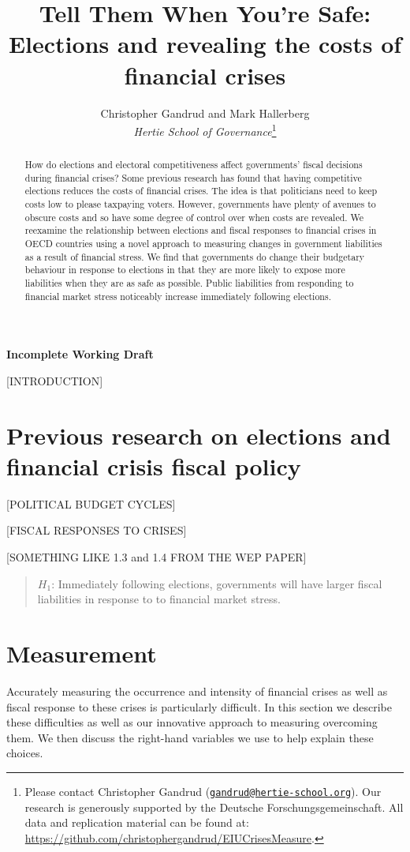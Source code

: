 \documentclass[]{article}
\title{Tell Them When You're Safe: Elections and revealing the costs of financial crises}
\author{Christopher Gandrud and Mark Hallerberg \\ \emph{Hertie School of Governance}\footnote{Please contact Christopher Gandrud
(\href{mailto:gandrud@hertie-school.org}{\nolinkurl{gandrud@hertie-school.org}}).
Our research is generously supported by the Deutsche Forschungsgemeinschaft.
All data and replication material can be found at:
\url{https://github.com/christophergandrud/EIUCrisesMeasure}.}}
\begin{document}
\maketitle


\textbf{Incomplete Working Draft}

\begin{abstract}
How do elections and electoral competitiveness affect governments' fiscal decisions during financial crises? Some previous research has found that having competitive elections reduces the costs of financial crises. The idea is that politicians need to keep costs low to please taxpaying voters. However, governments have plenty of avenues to obscure costs and so have some degree of control over when costs are revealed. We reexamine the relationship between elections and fiscal responses to financial crises in OECD countries using a novel approach to measuring changes in government liabilities as a result of financial stress. We find that governments do change their budgetary behaviour in response to elections in that they are more likely to expose more liabilities when they are as safe as possible. Public liabilities from responding to financial market stress noticeably increase immediately following elections.

\end{abstract}

[INTRODUCTION]

\section{Previous research on elections and financial crisis fiscal policy}

[POLITICAL BUDGET CYCLES]

[FISCAL RESPONSES TO CRISES]

[SOMETHING LIKE 1.3 and 1.4 FROM THE WEP PAPER]

\begin{quote}
        $H_{1}$: Immediately following elections, governments will have larger fiscal liabilities in response to to financial market stress.
\end{quote}

\section{Measurement}

Accurately measuring the occurrence and intensity of financial crises as well as fiscal response to these crises is particularly difficult. In this section we describe these difficulties as well as our innovative approach to measuring overcoming them. We then discuss the right-hand variables we use to help explain these choices.
\end{document}
